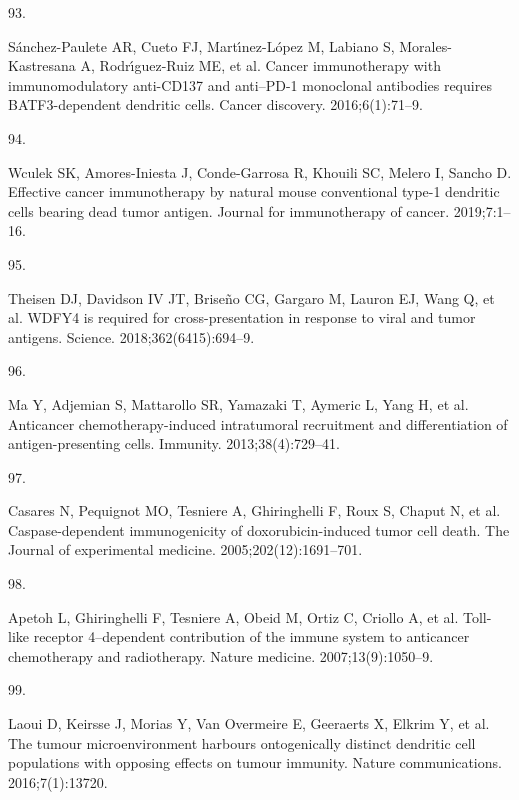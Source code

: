 \documentclass[
]{article}
\newlength{\cslhangindent}
\newlength{\csllabelwidth}
\newenvironment{CSLReferences}[2] %
 {\begin{list}{}{%
  \setlength{\itemindent}{0pt}
  \setlength{\leftmargin}{0pt}
  \setlength{\parsep}{0pt}
  \ifodd #1
   \setlength{\leftmargin}{\cslhangindent}
   \setlength{\itemindent}{-1\cslhangindent}
  \fi
  \setlength{\itemsep}{#2\baselineskip}}}
 {\end{list}}
\newcommand{\CSLLeftMargin}[1]{\parbox[t]{\csllabelwidth}{\strut#1\strut}}
\newcommand{\CSLRightInline}[1]{\parbox[t]{\linewidth - \csllabelwidth}{\strut#1\strut}}
\begin{document}
\begin{CSLReferences}{0}{1}
\CSLLeftMargin{93. }%
\CSLRightInline{Sánchez-Paulete AR, Cueto FJ, Martı́nez-López M, Labiano
S, Morales-Kastresana A, Rodrı́guez-Ruiz ME, et al. Cancer immunotherapy
with immunomodulatory anti-CD137 and anti--PD-1 monoclonal antibodies
requires BATF3-dependent dendritic cells. Cancer discovery.
2016;6(1):71--9. }

\CSLLeftMargin{94. }%
\CSLRightInline{Wculek SK, Amores-Iniesta J, Conde-Garrosa R, Khouili
SC, Melero I, Sancho D. Effective cancer immunotherapy by natural mouse
conventional type-1 dendritic cells bearing dead tumor antigen. Journal
for immunotherapy of cancer. 2019;7:1--16. }

\CSLLeftMargin{95. }%
\CSLRightInline{Theisen DJ, Davidson IV JT, Briseño CG, Gargaro M,
Lauron EJ, Wang Q, et al. WDFY4 is required for cross-presentation in
response to viral and tumor antigens. Science. 2018;362(6415):694--9. }

\CSLLeftMargin{96. }%
\CSLRightInline{Ma Y, Adjemian S, Mattarollo SR, Yamazaki T, Aymeric L,
Yang H, et al. Anticancer chemotherapy-induced intratumoral recruitment
and differentiation of antigen-presenting cells. Immunity.
2013;38(4):729--41. }

\CSLLeftMargin{97. }%
\CSLRightInline{Casares N, Pequignot MO, Tesniere A, Ghiringhelli F,
Roux S, Chaput N, et al. Caspase-dependent immunogenicity of
doxorubicin-induced tumor cell death. The Journal of experimental
medicine. 2005;202(12):1691--701. }

\CSLLeftMargin{98. }%
\CSLRightInline{Apetoh L, Ghiringhelli F, Tesniere A, Obeid M, Ortiz C,
Criollo A, et al. Toll-like receptor 4--dependent contribution of the
immune system to anticancer chemotherapy and radiotherapy. Nature
medicine. 2007;13(9):1050--9. }

\CSLLeftMargin{99. }%
\CSLRightInline{Laoui D, Keirsse J, Morias Y, Van Overmeire E, Geeraerts
X, Elkrim Y, et al. The tumour microenvironment harbours ontogenically
distinct dendritic cell populations with opposing effects on tumour
immunity. Nature communications. 2016;7(1):13720. }

\end{CSLReferences}
\end{document}
